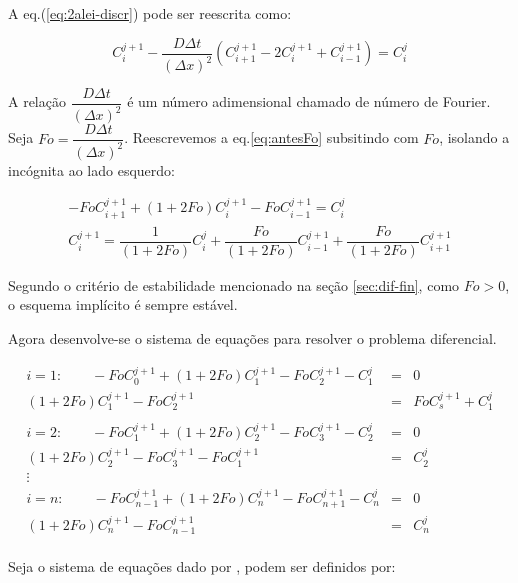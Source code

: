 A eq.(\ref{eq:2alei-discr}) pode ser reescrita como:

\begin{equation}
\label{eq:antesFo}
C_i^{j+1} - \frac{D\Delta t}{(\Delta x)^2} (C_{i+1}^{j+1} - 2C_i^{j+1} + C_{i-1}^{j+1}) = C_i^j
\end{equation}

A relação $\dfrac{D\Delta t}{(\Delta x)^2}$ é um número adimensional chamado de número de Fourier. Seja $Fo = \dfrac{D\Delta t}{(\Delta x)^2} $. Reescrevemos a eq.\ref{eq:antesFo} subsitindo com $Fo$, isolando a incógnita ao lado esquerdo:

\begin{gather*}
\label{eq:depoisFo}
- FoC_{i+1}^{j+1} + (1+2Fo)C_i^{j+1} - FoC_{i-1}^{j+1} = C_i^j \\
C_i^{j+1} = \dfrac{1}{(1+2Fo)}C_i^j + \dfrac{Fo}{(1+2Fo)}C_{i-1}^{j+1} + \dfrac{Fo}{(1+2Fo)}C_{i+1}^{j+1}
\end{gather*}

Segundo o critério de estabilidade mencionado na seção \ref{sec:dif-fin}, como $Fo>0$, o esquema implícito é sempre estável.

Agora desenvolve-se o sistema de equações para resolver o problema diferencial.

\begin{equation*}
\label{eq:depoisFo}
\begin{matrix}
i = 1: \qquad -FoC_{0}^{j+1} + (1+2Fo)C_1^{j+1} - FoC_{2}^{j+1} - C_1^j & = & 0\\
(1+2Fo)C_1^{j+1} - FoC_{2}^{j+1}& = & FoC_{s}^{j+1}  + C_1^j \\ 
\\
i = 2: \qquad -FoC_{1}^{j+1} + (1+2Fo)C_2^{j+1} - FoC_{3}^{j+1} - C_2^j & = & 0\\
(1+2Fo)C_2^{j+1} - FoC_{3}^{j+1} - FoC_{1}^{j+1} & = & C_2^j \\ 
\vdots \\
i = n: \qquad -FoC_{n-1}^{j+1} + (1+2Fo)C_n^{j+1} - FoC_{n+1}^{j+1} - C_n^j & = & 0\\
(1+2Fo)C_n^{j+1} - FoC_{n-1}^{j+1} & = & C_n^j \\ 
\end{matrix}
\end{equation*}

Seja o sistema de equações dado por ,  podem ser definidos por:

